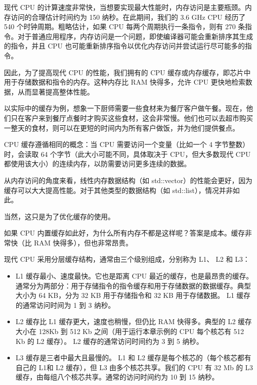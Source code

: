 
现代 CPU 的计算速度非常快，当想要实现最大性能时，内存访问是主要瓶颈。内存访问的合理估计时间约为 150 纳秒。在此期间，我们的 3.6 GHz CPU 经历了 540 个时钟周期。粗略估计，如果 CPU 每两个周期执行一条指令，则有 270 条指令。对于普通应用程序，内存访问是一个问题，即使编译器可能会重新排序其生成的指令，并且 CPU 也可能重新排序指令以优化内存访问并尝试运行尽可能多的指令。

因此，为了提高现代 CPU 的性能，我们拥有的 CPU 缓存或内存缓存，即芯片中用于存储数据和指令的内存。这种内存比 RAM 快得多，允许 CPU 更快地检索数据，从而显著提高整体性能。

以实际中的缓存为例，想象一下厨师需要一些食材来为餐厅客户做午餐。现在，他们只在客户来到餐厅点餐时才购买这些食材，这会非常慢。他们也可以去超市购买一整天的食材，则可以在更短的时间内为所有客户做饭，并为他们提供餐点。

CPU 缓存遵循相同的概念：当 CPU 需要访问一个变量（比如一个 4 字节整数）时，会读取 64 个字节（此大小可能不同，具体取决于 CPU，但大多数现代 CPU 都使用该大小）的连续内存，以防需要访问更多连续的数据。

从内存访问的角度来看，线性内存数据结构（如 std::vector）的性能会更好，因为缓存可以大大提高性能。对于其他类型的数据结构（如 std::list），情况并非如此。

当然，这只是为了优化缓存的使用。

如果 CPU 内置缓存如此好，为什么所有内存不都是这样呢？答案是成本。缓存非常快（比 RAM 快得多），但也非常昂贵。

现代 CPU 采用分层缓存结构，通常由三个级别组成，分别称为 L1、 L2 和 L3：

\begin{itemize}
\item
L1 缓存最小、速度最快。它也是距离 CPU 最近的缓存，也是最昂贵的缓存。通常分为两部分：用于存储指令的指令缓存和用于存储数据的数据缓存。典型大小为 64 KB，分为 32 KB 用于存储指令和 32 KB 用于存储数据。 L1 缓存的通常访问时间为 1 到 3 纳秒。

\item
L2 缓存比 L1 缓存更大，速度也稍慢，但仍比 RAM 快得多。典型的 L2 缓存大小在 128Kb 到 512 Kb 之间（用于运行本章示例的 CPU 每个核芯有 512 Kb 的 L2 缓存）。 L2 缓存的通常访问时间约为 3 到 5 纳秒。

\item
L3 缓存是三者中最大且最慢的。 L1 和 L2 缓存是每个核芯的（每个核芯都有自己的 L1和 L2 缓存），但 L3 由多个核芯共享。我们的 CPU 有 32 Mb 的 L3 缓存，由每组八个核芯共享。通常的访问时间约为 10 到 15 纳秒。
\end{itemize}

